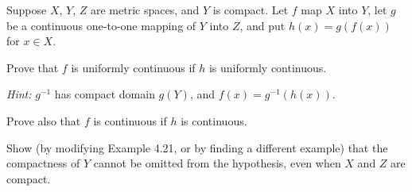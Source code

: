 \begin{questions}
  \question Suppose $X$, $Y$, $Z$ are metric spaces, and $Y$ is compact. Let $f$ map $X$ into $Y$, let $g$ be a continuous one-to-one mapping of $Y$ into $Z$, and put $h(x)=g(f(x))$ for $x\in X$.

  Prove that $f$ is uniformly continuous if $h$ is uniformly continuous.

  \emph{Hint:} $g^{-1}$ has compact domain $g(Y)$, and $f(x)=g^{-1}(h(x))$.

  Prove also that $f$ is continuous if $h$ is continuous.

  Show (by modifying Example 4.21, or by finding a different example) that the compactness of $Y$ cannot be omitted from the hypothesis, even when $X$ and $Z$ are compact.
\end{questions}

